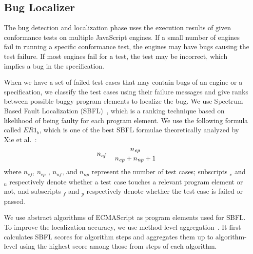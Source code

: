 \subsection{Bug Localizer}

The bug detection and localization phase uses the execution results of
given conformance tests on multiple JavaScript engines.
If a small number of engines fail in running a specific conformance test,
the engines may have bugs causing the test failure.
If most engines fail for a test, the test may be incorrect,
which implies a bug in the specification.

When we have a set of failed test cases that may contain bugs of an engine or a
specification, we classify the test cases using their failure
messages and give ranks between possible buggy program elements to localize the bug.
We use Spectrum Based Fault Localization (SBFL)~\cite{sbfl-survey},
which is a ranking technique based on likelihood of being faulty for each
program element.  We use the following formula called $ER1_b$,
which is one of the best SBFL formulae theoretically analyzed by Xie et al.~\cite{er1b}:
\[
  {n_{\mbox{\emph{\scriptsize ef}}}} -
  {
    {n_{\mbox{\emph{\scriptsize ep}}}}
    \over
    {n_{\mbox{\emph{\scriptsize ep}}} + n_{\mbox{\emph{\scriptsize np}}} + 1}
  }
\]
where $n_{ef}$, $n_{ep}$ , $n_{nf}$, and $n_{np}$ represent the number of test
cases; subscripts ${}_e$ and ${}_n$ respectively denote whether a test case touches a
relevant program element or not, and subscripts ${}_f$ and ${}_p$
respectively denote whether the test case is failed or passed.

We use abstract algorithms of ECMAScript as program elements used for SBFL.
To improve the localization accuracy, we use method-level aggregation~\cite{fluccs}.
It first calculates SBFL scores for algorithm steps and aggregates
them up to algorithm-level using the highest score among those from steps of each algorithm.
